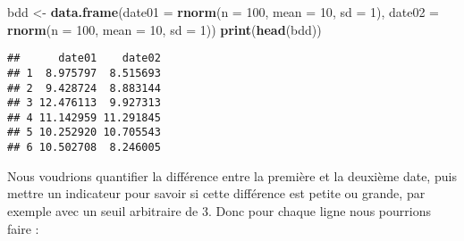 \documentclass[]{book}
\newenvironment{Shaded}{\begin{snugshade}}{\end{snugshade}}
\newcommand{\KeywordTok}[1]{\textcolor[rgb]{0.13,0.29,0.53}{\textbf{#1}}}
\newcommand{\DataTypeTok}[1]{\textcolor[rgb]{0.13,0.29,0.53}{#1}}
\newcommand{\DecValTok}[1]{\textcolor[rgb]{0.00,0.00,0.81}{#1}}
\newcommand{\StringTok}[1]{\textcolor[rgb]{0.31,0.60,0.02}{#1}}
\newcommand{\NormalTok}[1]{#1}
\theoremstyle{definition}
\theoremstyle{definition}
\theoremstyle{definition}
\theoremstyle{remark}
\begin{document}
\begin{Shaded}
\begin{Highlighting}[]
\NormalTok{bdd <-}\StringTok{ }\KeywordTok{data.frame}\NormalTok{(}\DataTypeTok{date01 =} \KeywordTok{rnorm}\NormalTok{(}\DataTypeTok{n =} \DecValTok{100}\NormalTok{, }\DataTypeTok{mean =} \DecValTok{10}\NormalTok{, }\DataTypeTok{sd =} \DecValTok{1}\NormalTok{), }
                  \DataTypeTok{date02 =} \KeywordTok{rnorm}\NormalTok{(}\DataTypeTok{n =} \DecValTok{100}\NormalTok{, }\DataTypeTok{mean =} \DecValTok{10}\NormalTok{, }\DataTypeTok{sd =} \DecValTok{1}\NormalTok{))}
\KeywordTok{print}\NormalTok{(}\KeywordTok{head}\NormalTok{(bdd))}
\end{Highlighting}
\end{Shaded}

\begin{verbatim}
##      date01    date02
## 1  8.975797  8.515693
## 2  9.428724  8.883144
## 3 12.476113  9.927313
## 4 11.142959 11.291845
## 5 10.252920 10.705543
## 6 10.502708  8.246005
\end{verbatim}

Nous voudrions quantifier la différence entre la première et la deuxième
date, puis mettre un indicateur pour savoir si cette différence est
petite ou grande, par exemple avec un seuil arbitraire de 3. Donc pour
chaque ligne nous pourrions faire :
\end{document}
